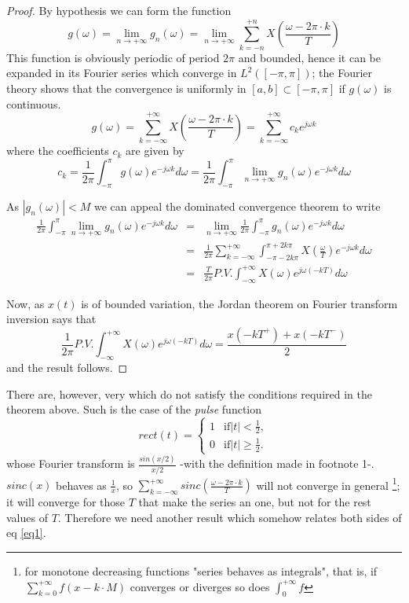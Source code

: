 \documentclass[12pt]{article}
\theoremstyle{definition}
\theoremstyle{remark}
\newcommand{\abs}[1]{\left\vert#1\right\vert}
\newcommand{\To}{\rightarrow}
\newcommand{\replica}[3]{\sum_{k=#2}^{#3} #1 \left(\frac{\omega- 2\pi \cdot k}{T}
\right)}
\begin{document}
\begin{proof}
By hypothesis we can form the function $$g(\omega)=\lim_{n \To
+\infty } g_n(\omega)= \lim_{n \To +\infty } \replica{X}{-n}{+n}$$
This function is obviously periodic of period $2 \pi$ and bounded,
hence it can be expanded in its Fourier series which converge in
$L^2([-\pi, \pi])$; the Fourier theory shows that the convergence is
uniformly in $[a,b] \subset [-\pi, \pi]$ if $g(\omega)$ is
continuous.
$$g(\omega)= \replica{X}{-\infty}{+\infty} =
\sum_{k=-\infty}^{+\infty} c_ke^{j\omega k}$$ where the coefficients
$c_k$ are given by $$ c_k = \frac{1}{2\pi} \int_{-\pi}^{\pi}
g(\omega) e^{-j\omega k} d\omega = \frac{1}{2\pi} \int_{-\pi}^{\pi}
\lim_{n \To +\infty } g_n(\omega) e^{-j\omega k} d\omega$$

As $\abs{g_n(\omega)}<M$ we can appeal the dominated convergence
theorem to write
\begin{eqnarray*}
\frac{1}{2\pi} \int_{-\pi}^{\pi} \lim_{n \To +\infty } g_n(\omega)
e^{-j\omega k} d\omega & = & \lim_{n \To +\infty } \frac{1}{2\pi}
\int_{-\pi}^{\pi} g_n(\omega) e^{-j\omega k} d\omega \\ & = &
\frac{1}{2\pi} \sum_{k=-\infty}^{+\infty}
\int_{-\pi-2k\pi}^{\pi+2k\pi} X \left(\frac{\omega}{T}\right)
e^{-j\omega k} d\omega \\ & = & \frac{T}{2\pi} P.V.
\int_{-\infty}^{+\infty} X(\omega) e^{j\omega(-kT)} d\omega
\end{eqnarray*}

Now, as $x(t)$ is of bounded variation, the Jordan theorem on
Fourier transform inversion says that $$\frac{1}{2\pi} P.V.
\int_{-\infty}^{+\infty} X(\omega) e^{j\omega(-kT)} d\omega =
\frac{x(-kT^+)+x(-kT^-)}{2}$$ and the result follows.

\end{proof}

\noindent There are, however, very  which do not
satisfy the conditions required in the theorem above. Such is the
case of the \emph{pulse} function $$rect(t)= \begin{cases}
1 & \text{if} \abs{t} < \frac{1}{2},\\
0 & \text{if} \abs{t} \geq \frac{1}{2}.
\end{cases}$$ whose Fourier transform is $\frac{sin(x/2)}{x/2}$ -with the definition made in
footnote 1-. $sinc(x)$ behaves as $\frac{1}{x}$, so
$\sum_{k=-\infty}^{+\infty} sinc \left(\frac{\omega- 2\pi \cdot
k}{T} \right)$ will not converge in general \footnote{for monotone
decreasing functions "series behaves as integrals", that is, if
$\sum_{k=0}^{+\infty} f(x-k \cdot M)$ converges or diverges so does
$\int_{0}^{+\infty} f$}; it will converge for those $T$ that make
the series an  one, but not for the rest values of $T$.
Therefore we need another result which somehow relates both sides of
eq \ref{eq1}.
\end{document}
